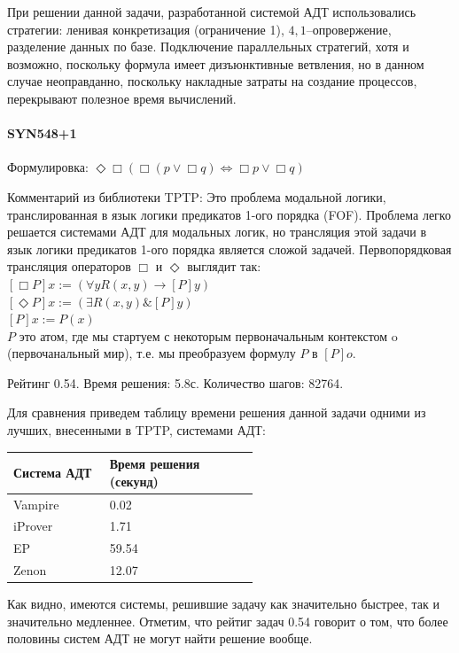 При решении данной задачи, разработанной системой АДТ использовались стратегии: ленивая конкретизация (ограничение 1), $4,1$--опровержение, разделение данных по базе. Подключение параллельных стратегий, хотя и возможно, поскольку формула имеет дизъюнктивные ветвления, но в данном случае неоправданно, поскольку накладные затраты на создание процессов, перекрывают полезное время вычислений.



\paragraph{SYN548+1}
Формулировка: $\Diamond \Box (\Box (p \vee \Box q) \Leftrightarrow \Box p \vee \Box q)$

Комментарий из библиотеки TPTP: Это проблема модальной логики, транслированная в язык логики предикатов 1-ого порядка (FOF).
Проблема легко решается системами АДТ для модальных логик, но трансляция этой задачи в язык логики предикатов 1-ого порядка является сложой задачей. Первопорядковая трансляция операторов $\Box$ и $\Diamond$ выглядит так:
               	$[\Box P]x := (\forall y R(x,y) \rightarrow [P]y)$ \\
               	$[\Diamond P]x := (\exists R(x,y) \& [P]y)$ \\
               	$[P]x := P(x)$ \\
$P$ это атом, где мы стартуем с некоторым первоначальным контекстом o (первочанальный мир), т.е. мы преобразуем формулу $P$ в $[P]o$.

Рейтинг 0.54. Время решения: 5.8с. Количество шагов: 82764.

Для сравнения приведем таблицу времени решения данной задачи одними из лучших, внесенными в TPTP, системами АДТ:

\begin{longtable}[H]{|p{0.2\linewidth}|p{0.35\linewidth}|}
\hline
\textbf{Система АДТ} & \textbf{Время решения (секунд)}  \\
\hline
Vampire & 0.02 \\
\hline
iProver & 1.71 \\
\hline
EP & 59.54  \\
\hline
Zenon & 12.07 \\
\hline
\end{longtable}

Как видно, имеются системы, решившие задачу как значительно быстрее, так и значительно медленнее. Отметим, что рейтиг задач 0.54 говорит о том, что более половины систем АДТ не могут найти решение вообще.

